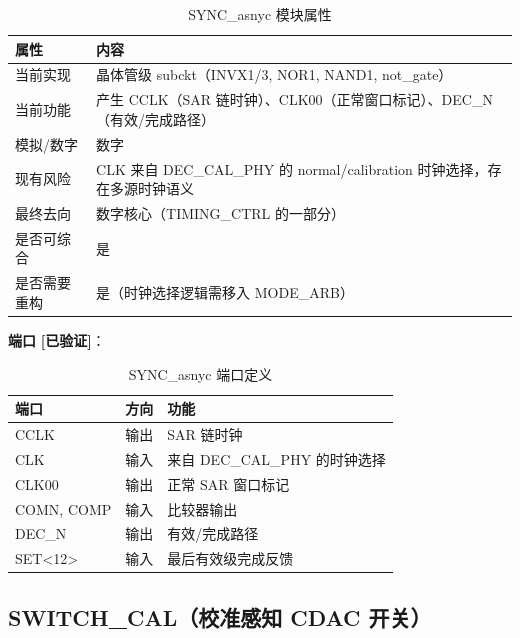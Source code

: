 \documentclass[UTF8,a4paper,11pt]{ctexart}
\newcommand{\verified}{\textcolor{verifiedgreen}{\textbf{[已验证]}}}
\begin{document}
\begin{table}[H]
\centering
\caption{SYNC\_asnyc 模块属性}
\label{tab:sync-attr}
\begin{tabular}{ll}
\toprule
属性 & 内容 \\
\midrule
当前实现   & 晶体管级 subckt（INVX1/3, NOR1, NAND1, not\_gate） \\
当前功能   & 产生 CCLK（SAR 链时钟）、CLK00（正常窗口标记）、DEC\_N（有效/完成路径） \\
模拟/数字  & 数字 \\
现有风险   & CLK 来自 DEC\_CAL\_PHY 的 normal/calibration 时钟选择，存在多源时钟语义 \\
最终去向   & 数字核心（TIMING\_CTRL 的一部分） \\
是否可综合 & 是 \\
是否需要重构 & 是（时钟选择逻辑需移入 MODE\_ARB） \\
\bottomrule
\end{tabular}
\end{table}

\textbf{端口} \verified：

\begin{table}[H]
\centering
\caption{SYNC\_asnyc 端口定义}
\label{tab:sync-ports}
\begin{tabular}{lll}
\toprule
端口 & 方向 & 功能 \\
\midrule
CCLK       & 输出 & SAR 链时钟 \\
CLK        & 输入 & 来自 DEC\_CAL\_PHY 的时钟选择 \\
CLK00      & 输出 & 正常 SAR 窗口标记 \\
COMN, COMP & 输入 & 比较器输出 \\
DEC\_N     & 输出 & 有效/完成路径 \\
SET<12>    & 输入 & 最后有效级完成反馈 \\
\bottomrule
\end{tabular}
\end{table}

\subsection{SWITCH\_CAL（校准感知 CDAC 开关）}
\end{document}
